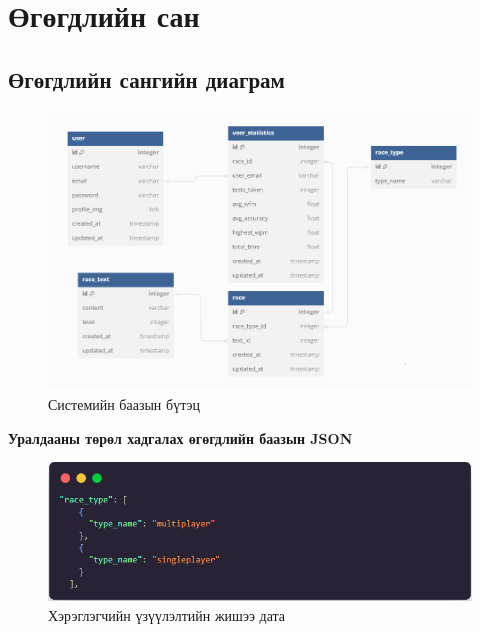 


\clearpage
\section{Өгөгдлийн сан}

\subsection{Өгөгдлийн сангийн диаграм}
\begin{figure}[h]
	\centering
	\includegraphics[width=15cm]{images/rd_schema.png}
	\caption{Системийн баазын бүтэц}
	\label{fig:erd}
\end{figure}

\pagebreak

\textbf{Уралдааны төрөл хадгалах өгөгдлийн баазын JSON}

\begin{figure}[h]
	\centering
	\includegraphics[width=15cm]{images/race_type_json.png}
	\caption{Хэрэглэгчийн үзүүлэлтийн жишээ дата}
	\label{fig:erd}
\end{figure}

